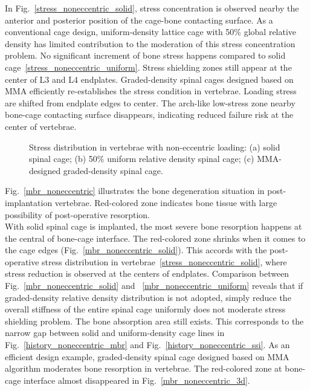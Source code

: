\documentclass[12pt]{extbook}
\begin{document}
In Fig.~\ref{stress_noneccentric_solid}, stress concentration is observed nearby the anterior and posterior position of the cage-bone contacting surface. As a conventional cage design, uniform-density lattice cage with 50\% global relative density has limited contribution to the moderation of this stress concentration problem. No significant increment of bone stress happens compared to solid cage~\ref{stress_noneccentric_uniform}. Stress shielding zones still appear at the center of L3 and L4 endplates. Graded-density spinal cages designed based on MMA efficiently re-establishes the stress condition in vertebrae. Loading stress are shifted from endplate edges to center. The arch-like low-stress zone nearby bone-cage contacting surface disappears, indicating reduced failure risk at the center of vertebrae.\\ 

\begin{figure}[htbp]
\centering
{}
\caption{Stress distribution in vertebrae with non-eccentric loading: (a) solid spinal cage; (b) 50\% uniform relative density spinal cage; (c) MMA-designed graded-density spinal cage.}
\label{stress_noneccentric}
\end{figure}

Fig.~\ref{mbr_noneccentric} illustrates the bone degeneration situation in post-implantation vertebrae. Red-colored zone indicates bone tissue with large possibility of post-operative resorption.\\

With solid spinal cage is implanted, the most severe bone resorption happens at the central of bone-cage interface. The red-colored zone shrinks when it comes to the cage edges (Fig.~\ref{mbr_noneccentric_solid}). This accords with the post-operative stress distribution in vertebrae~\ref{stress_noneccentric_solid}, where stress reduction is observed at the centers of endplates. Comparison between Fig.~\ref{mbr_noneccentric_solid} and ~\ref{mbr_noneccentric_uniform} reveals that if graded-density relative density distribution is not adopted, simply reduce the overall stiffness of the entire spinal cage uniformly does not moderate stress shielding problem. The bone absorption area still exists. This corresponds to the narrow gap between solid and uniform-density cage lines in Fig.~\ref{history_noneccentric_mbr} and Fig.~\ref{history_noneccentric_ssi}. As an efficient design example, graded-density spinal cage designed based on MMA algorithm moderates bone resorption in vertebrae. The red-colored zone at bone-cage interface almost disappeared in Fig.~\ref{mbr_noneccentric_3d}.\\
\end{document}

